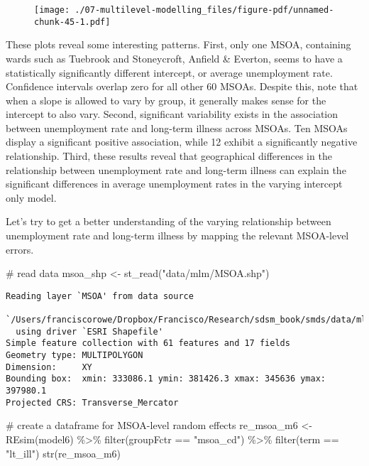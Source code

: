 \documentclass[
  letterpaper,
  krantz2]{style/krantz}
\newenvironment{Shaded}{\begin{snugshade}}{\end{snugshade}}
\newcommand{\CommentTok}[1]{\textcolor[rgb]{0.37,0.37,0.37}{#1}}
\newcommand{\FunctionTok}[1]{\textcolor[rgb]{0.28,0.35,0.67}{#1}}
\newcommand{\NormalTok}[1]{\textcolor[rgb]{0.00,0.23,0.31}{#1}}
\newcommand{\OtherTok}[1]{\textcolor[rgb]{0.00,0.23,0.31}{#1}}
\newcommand{\SpecialCharTok}[1]{\textcolor[rgb]{0.37,0.37,0.37}{#1}}
\newcommand{\StringTok}[1]{\textcolor[rgb]{0.13,0.47,0.30}{#1}}
\begin{document}
\begin{figure}[H]

{\centering \texttt{[image: ./07-multilevel-modelling\_files/figure-pdf/unnamed-chunk-45-1.pdf]}

}

\end{figure}

These plots reveal some interesting patterns. First, only one MSOA,
containing wards such as Tuebrook and Stoneycroft, Anfield \& Everton,
seems to have a statistically significantly different intercept, or
average unemployment rate. Confidence intervals overlap zero for all
other 60 MSOAs. Despite this, note that when a slope is allowed to vary
by group, it generally makes sense for the intercept to also vary.
Second, significant variability exists in the association between
unemployment rate and long-term illness across MSOAs. Ten MSOAs display
a significant positive association, while 12 exhibit a significantly
negative relationship. Third, these results reveal that geographical
differences in the relationship between unemployment rate and long-term
illness can explain the significant differences in average unemployment
rates in the varying intercept only model.

Let's try to get a better understanding of the varying relationship
between unemployment rate and long-term illness by mapping the relevant
MSOA-level errors.

\begin{Shaded}
\begin{Highlighting}[]
\CommentTok{\# read data}
\NormalTok{msoa\_shp }\OtherTok{\textless{}{-}} \FunctionTok{st\_read}\NormalTok{(}\StringTok{"data/mlm/MSOA.shp"}\NormalTok{)}
\end{Highlighting}
\end{Shaded}

\begin{verbatim}
Reading layer `MSOA' from data source 
  `/Users/franciscorowe/Dropbox/Francisco/Research/sdsm_book/smds/data/mlm/MSOA.shp' 
  using driver `ESRI Shapefile'
Simple feature collection with 61 features and 17 fields
Geometry type: MULTIPOLYGON
Dimension:     XY
Bounding box:  xmin: 333086.1 ymin: 381426.3 xmax: 345636 ymax: 397980.1
Projected CRS: Transverse_Mercator
\end{verbatim}

\begin{Shaded}
\begin{Highlighting}[]
\CommentTok{\# create a dataframe for MSOA{-}level random effects}
\NormalTok{re\_msoa\_m6 }\OtherTok{\textless{}{-}} \FunctionTok{REsim}\NormalTok{(model6) }\SpecialCharTok{\%\textgreater{}\%} \FunctionTok{filter}\NormalTok{(groupFctr }\SpecialCharTok{==} \StringTok{"msoa\_cd"}\NormalTok{) }\SpecialCharTok{\%\textgreater{}\%}
  \FunctionTok{filter}\NormalTok{(term }\SpecialCharTok{==} \StringTok{"lt\_ill"}\NormalTok{)}
\FunctionTok{str}\NormalTok{(re\_msoa\_m6)}
\end{Highlighting}
\end{Shaded}
\end{document}
